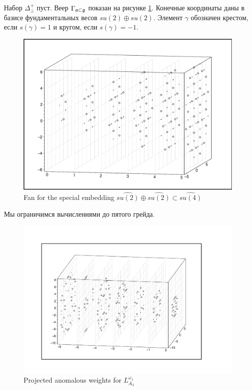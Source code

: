 \documentclass[a4paper,12pt]{article}
\theoremstyle{definition} \newtheorem{Def}{Definition}
\begin{document}
Набор $\Delta^{+}_{\bot}$ пуст.
Веер  $\Gamma _{\frak{a}\subset \frak{g}}$ показан на рисунке \ref{fig:A1+A1-A3_fan}. Конечные координаты
даны в базисе фундаментальных весов $su(2)\oplus su(2)$. Элемент $\gamma$ обозначен крестом, если
$s(\gamma)=1$ и кругом, если $s(\gamma)=-1$.
\begin{figure}[h!tb]
  \includegraphics[width=150mm]{A1+A1-A3_fan.pdf}
  \caption{Fan for the special embedding $\widehat{su(2)}\oplus\widehat{su(2)}\subset \widehat{su(4)}$}
  \label{fig:A1+A1-A3_fan}
\end{figure}

Мы ограничимся вычислениями до пятого грейда.
\begin{figure}[h!tb]
  \includegraphics[width=170mm]{A1+A1-A3_anom.pdf}
  \caption{Projected anomalous weights for $L^{\omega_1}_{A_3}$}
  \label{fig:A1+A1-A3_anom}
\end{figure}
\end{document}
